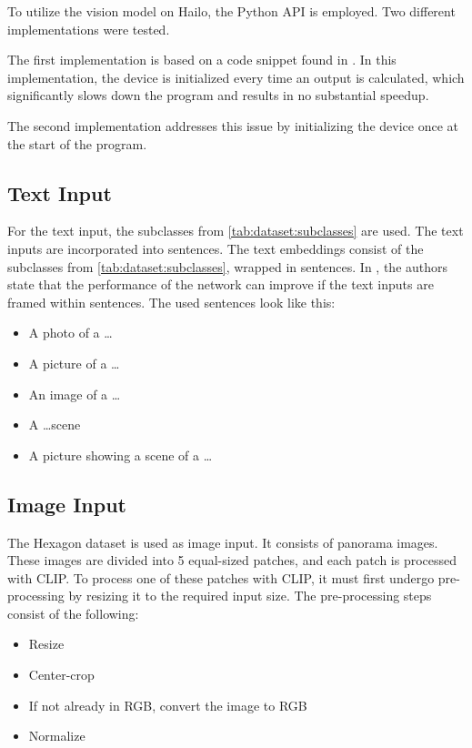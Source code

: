 To utilize the vision model on Hailo, the Python API is employed. 
Two different implementations were tested.

The first implementation is based on a code snippet found in \cite{hailoimplementation}.
In this implementation, the device is initialized every time an output is calculated, which significantly slows down the program and results in no substantial speedup.

The second implementation addresses this issue by initializing the device once at the start of the program. 

\subsection{Text Input}

For the text input, the subclasses from \cref{tab:dataset:subclasses} are used. 
The text inputs are incorporated into sentences.
The text embeddings consist of the subclasses from \cref{tab:dataset:subclasses}, wrapped in sentences.
In \cite{clip}, the authors state that the performance of the network can improve if the text inputs are framed within sentences.
The used sentences look like this:
\begin{itemize}
    \item A photo of a \dots
    \item A picture of a \dots
    \item An image of a \dots
    \item A \dots scene
    \item A picture showing a scene of a \dots
\end{itemize}

\subsection{Image Input}
The Hexagon dataset is used as image input.
It consists of panorama images. 
These images are divided into 5 equal-sized patches, and each patch is processed with CLIP.
To process one of these patches with CLIP, it must first undergo pre-processing by resizing it to the required input size.
The pre-processing steps consist of the following:

\begin{itemize}
    \item Resize
    \item Center-crop
    \item If not already in RGB, convert the image to RGB
    \item Normalize
\end{itemize}

